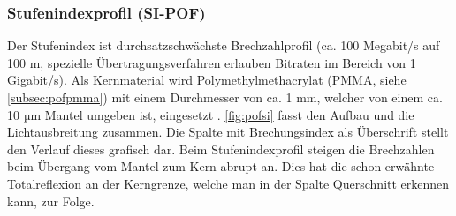 \subsubsection{Stufenindexprofil (SI-POF)}

Der Stufenindex ist durchsatzschwächste Brechzahlprofil (ca. 100 Megabit/s auf
100 m, spezielle Übertragungsverfahren erlauben Bitraten im Bereich von 1
Gigabit/s). Als Kernmaterial wird Polymethylmethacrylat (PMMA, siehe
\autoref{subsec:pofpmma}) mit einem Durchmesser von ca. 1 mm, welcher von einem
ca. 10 µm Mantel umgeben ist, eingesetzt \cite{pofacsi}. \autoref{fig:pofsi}
fasst den Aufbau und die Lichtausbreitung zusammen. Die Spalte mit
Brechungsindex als Überschrift stellt den Verlauf dieses grafisch dar. Beim
Stufenindexprofil steigen die Brechzahlen beim Übergang vom Mantel zum Kern
abrupt an. Dies hat die schon erwähnte Totalreflexion an der Kerngrenze, welche
man in der Spalte Querschnitt erkennen kann, zur Folge.


